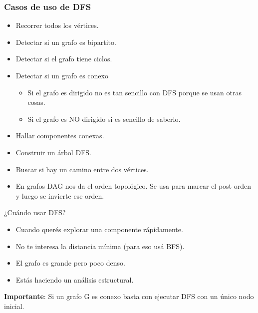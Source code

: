 \documentclass[10pt,a4paper]{article}
\begin{document}
\subsubsection*{Casos de uso de DFS}
\begin{itemize}
    \item Recorrer todos los vértices.
    \item Detectar si un grafo es bipartito.
    \item Detectar si el grafo tiene ciclos. 
    \item Detectar si un grafo es conexo
    \begin{itemize}
        \item Si el grafo es dirigido no es tan sencillo con DFS porque se usan otras cosas.
        \item Si el grafo es NO dirigido si es sencillo de saberlo. 
    \end{itemize}
    \item Hallar componentes conexas.
    \item Construir un árbol DFS. 
    \item Buscar si hay un camino entre dos vértices.
    \item En grafos DAG nos da el orden topológico. Se usa para marcar el post orden y luego se invierte ese orden. 
\end{itemize}
¿Cuándo usar DFS? 
\begin{itemize}
    \item Cuando querés explorar una componente rápidamente.
    \item No te interesa la distancia mínima (para eso usá BFS).
    \item El grafo es grande pero poco denso. 
    \item Estás haciendo un análisis estructural.
\end{itemize}
\textbf{Importante}: Si un grafo G es conexo basta con ejecutar DFS con un único nodo inicial.
\end{document}
